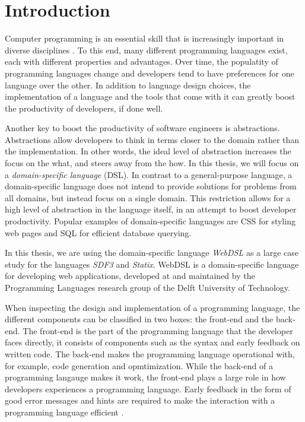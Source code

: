 
\chapter{\label{chap:introduction}Introduction}

  Computer programming is an essential skill that is increasingly important in diverse disciplines \autocite{Rafalski2019}. To this end, many different programming languages exist, each with different properties and advantages. Over time, the populatity of programming languages change and developers tend to have preferences for one language over the other. In addition to language design choices, the implementation of a language and the tools that come with it can greatly boost the productivity of developers, if done well.

  Another key to boost the productivity of software engineers is abstractions. Abstractions allow developers to think in terms closer to the domain rather than the implementation. In other words, the ideal level of abstraction increases the focus on the what, and steers away from the how. In this thesis, we will focus on a \textit{domain-specific language} (DSL). In contrast to a general-purpose language, a domain-specific language does not intend to provide solutions for problems from all domains, but instead focus on a single domain. This restriction allows for a high level of abstraction in the language itself, in an attempt to boost developer productivity. Popular examples of domain-specific languages are CSS for styling web pages and SQL for efficient database querying.

  In this thesis, we are using the domain-specific language \textit{WebDSL} as a large case study for the languages \textit{SDF3} and \textit{Statix}. WebDSL is a domain-specific language for developing web applications, developed at and maintained by the Programming Languages research group of the Delft University of Technology.

  When inspecting the design and implementation of a programming language, the different components can be classified in two boxes: the front-end and the back-end. The front-end is the part of the programming language that the developer faces directly, it consists of components such as the syntax and early feedback on written code. The back-end makes the programming language operational with, for example, code generation and opmtimization. While the back-end of a programming langauge makes it work, the front-end plays a large role in how developers experiences a programming language. Early feedback in the form of good error messages and hints are required to make the interaction with a programming language efficient \autocite{Becker2019}.

